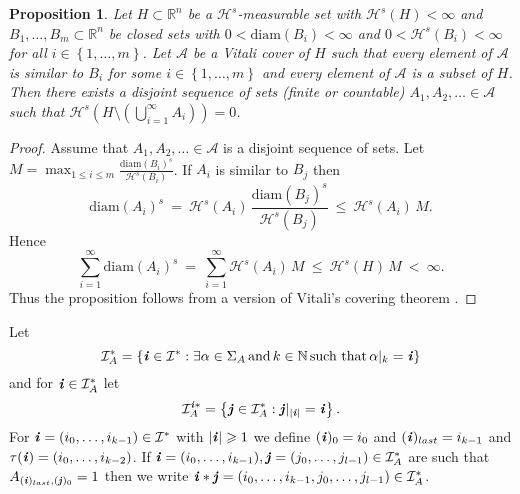 \documentclass[11pt,english,british]{article}
\numberwithin{equation}{section}
\newtheorem{prop}[thm]{Proposition}
\renewcommand{\geq}{\geqslant}
\renewcommand{\leq}{\leqslant}
\begin{document}
\begin{prop}
\label{lem:VCT}
Let $H\subset\mathbb{R}^{n}$ be a $\mathcal{H}^{s}$-measurable set
with $\mathcal{H}^{s}(H)<\infty$ and $B_{1},\ldots,B_{m}\subset\mathbb{R}^{n}$
be closed sets with $0<\mathrm{diam}(B_{i})<\infty$ and $0<\mathcal{H}^{s}(B_{i})<\infty$
for all $i\in\left\{ 1,\ldots,m\right\} $. Let $\mathcal{A}$ be
a Vitali cover of $H$ such that every element of $\mathcal{A}$ is
similar to $B_{i}$ for some $i\in\left\{ 1,\ldots,m\right\} $ and
every element of $\mathcal{A}$ is a subset of $H$. Then there exists
a disjoint sequence of sets (finite or countable) $A_{1},A_{2},\ldots\in\mathcal{A}$
such that $\mathcal{H}^{s}\left(H\setminus\left(\bigcup_{i=1}^{\infty}A_{i}\right)\right)=0$.
\end{prop}
\begin{proof}
Assume that $A_{1},A_{2},\ldots\in\mathcal{A}$ is a disjoint sequence
of sets. Let $M=\max_{1\leq i\leq m}\frac{\mathrm{diam}(B_{i})^{s}}{\mathcal{H}^{s}(B_{i})}$.
If $A_{i}$ is similar to $B_{j}$ then
\[
\mathrm{diam}(A_{i})^{s} \ = \ \mathcal{H}^{s}(A_{i})\, \frac{\mathrm{diam}(B_{j})^{s}}{\mathcal{H}^{s}(B_{j})} \ \leq \ \mathcal{H}^{s}(A_{i})\, M.
\]
Hence
\[
\sum_{i=1}^{\infty}\mathrm{diam}(A_{i})^{s} \ = \ \sum_{i=1}^{\infty}\mathcal{H}^{s}(A_{i})\, M \ \leq \ \mathcal{H}^{s}(H)\, M \ < \ \infty.
\]
Thus the proposition follows from a version of Vitali's covering theorem \cite[Theorem 1.10]{vitali}.
\end{proof}
Let
\[
\mathcal{I}_{A}^{*}=\left\{ \textbf{\emph{i}}\in\mathcal{I}^{*}:\exists\alpha\in\Sigma_{A}\, \text{and} \, k\in\mathbb{N}\, \text{such that} \,\alpha\vert_{k}=\textbf{\emph{i}}\right\}
\]
and for $\textbf{\emph{i}}\in\mathcal{I}_{A}^{*}$ let
\[
\mathcal{I}_{A}^{\textbf{\emph{i}}*}=\left\{ \textbf{\emph{j}}\in\mathcal{I}_{A}^{*}:\textbf{\emph{j}}\vert_{\left|\textbf{\emph{i}}\right|}=\textbf{\emph{i}}\right\}.
\]
For $\textbf{\emph{i}}=(i_{0},\ldots,i_{k-1})\in\mathcal{I}^{*}$
with $\left|\textbf{\emph{i}}\right|\geq1$ we define $(\textbf{\emph{i}})_{0}=i_{0}$
and $(\textbf{\emph{i}})_{last}=i_{k-1}$ and $\tau(\textbf{\emph{i}})=(i_{0},\ldots,i_{k-2})$.
If $\textbf{\emph{i}}=(i_{0},\ldots,i_{k-1}),\textbf{\emph{j}}=(j_{0},\ldots,j_{l-1})\in\mathcal{I}_{A}^{*}$ are
such that $A_{(\textbf{\emph{i}})_{last},(\textbf{\emph{j}})_{0}}=1$
then we write $\textbf{\emph{i}}*\textbf{\emph{j}}=(i_{0},\ldots,i_{k-1},j_{0},\ldots,j_{l-1})\in\mathcal{I}_{A}^{*}$.
\end{document}

